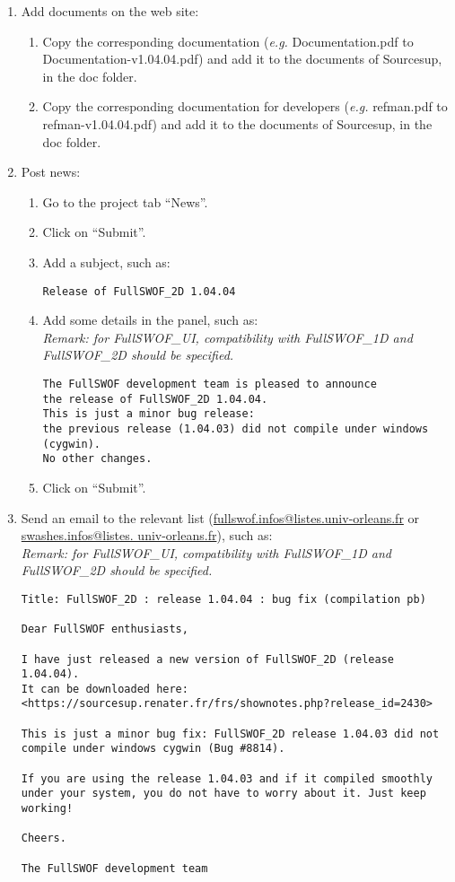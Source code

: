 \documentclass[a4paper, 11pt]{article}
\newcommand{\FullSWOFoneD}{\emph{FullSWOF\_1D}}
\newcommand{\FullSWOFtwoD}{\emph{FullSWOF\_2D}}
\newcommand{\FullSWOFUI}{\emph{FullSWOF\_UI}}
\begin{document}
\begin{enumerate}
\item Add documents on the web site:
\begin{enumerate}
\item Copy the corresponding documentation (\emph{e.g.} Documentation.pdf to Documentation-v1.04.04.pdf) and add it to the documents of Sourcesup, in the doc folder.
\item Copy the corresponding documentation for developers (\emph{e.g.} refman.pdf to refman-v1.04.04.pdf) and add it to the documents of Sourcesup, in the doc folder. 
\end{enumerate}
\item Post news:
\begin{enumerate}
\item Go to the project tab ``News''.
\item Click on ``Submit''.
\item Add a subject, such as:
\begin{verbatim}
Release of FullSWOF_2D 1.04.04 
\end{verbatim}
\item Add some details in the panel, such as:\\
\emph{Remark: for \FullSWOFUI, compatibility with \FullSWOFoneD{} and \FullSWOFtwoD{} should be specified.}
\begin{verbatim}
The FullSWOF development team is pleased to announce
the release of FullSWOF_2D 1.04.04.
This is just a minor bug release:
the previous release (1.04.03) did not compile under windows (cygwin).
No other changes.
\end{verbatim}
\item Click on ``Submit''.
\end{enumerate}
\item Send an email to the relevant list (\href{mailto:fullswof.infos@listes.univ-orleans.fr}{fullswof.infos@listes.univ-orleans.fr}
or
\href{mailto:swashes.infos@listes.univ-orleans.fr}{swashes.infos@listes. univ-orleans.fr}), such as:\\
\emph{Remark: for \FullSWOFUI, compatibility with \FullSWOFoneD{} and \FullSWOFtwoD{} should be specified.}
\begin{verbatim}
Title: FullSWOF_2D : release 1.04.04 : bug fix (compilation pb)

Dear FullSWOF enthusiasts,

I have just released a new version of FullSWOF_2D (release 1.04.04).
It can be downloaded here:
<https://sourcesup.renater.fr/frs/shownotes.php?release_id=2430>

This is just a minor bug fix: FullSWOF_2D release 1.04.03 did not
compile under windows cygwin (Bug #8814).

If you are using the release 1.04.03 and if it compiled smoothly
under your system, you do not have to worry about it. Just keep working!

Cheers.

The FullSWOF development team 
\end{verbatim}
\end{enumerate}
\end{document}
